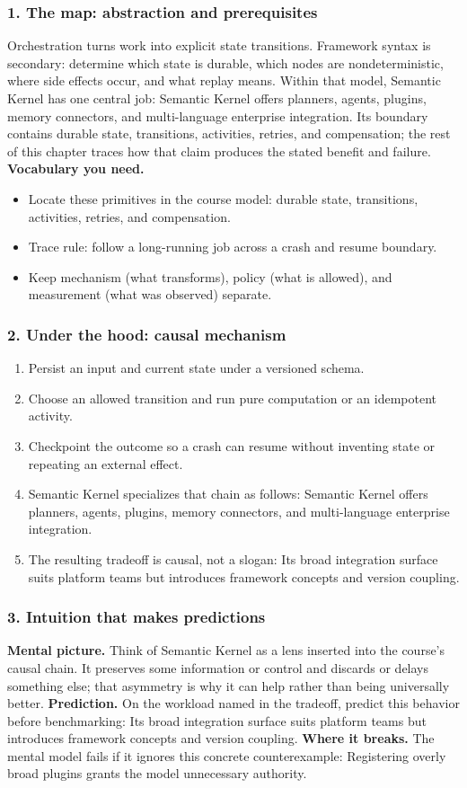 \subsubsection*{1. The map: abstraction and prerequisites}
Orchestration turns work into explicit state transitions. Framework syntax is secondary: determine which state is durable, which nodes are nondeterministic, where side effects occur, and what replay means.
Within that model, Semantic Kernel has one central job: Semantic Kernel offers planners, agents, plugins, memory connectors, and multi-language enterprise integration. Its boundary contains durable state, transitions, activities, retries, and compensation; the rest of this chapter traces how that claim produces the stated benefit and failure.
\textbf{Vocabulary you need.}\begin{itemize}
\item Locate these primitives in the course model: durable state, transitions, activities, retries, and compensation.
\item Trace rule: follow a long-running job across a crash and resume boundary.
\item Keep mechanism (what transforms), policy (what is allowed), and measurement (what was observed) separate.
\end{itemize}
\subsubsection*{2. Under the hood: causal mechanism}\begin{enumerate}
\item Persist an input and current state under a versioned schema.
\item Choose an allowed transition and run pure computation or an idempotent activity.
\item Checkpoint the outcome so a crash can resume without inventing state or repeating an external effect.
\item Semantic Kernel specializes that chain as follows: Semantic Kernel offers planners, agents, plugins, memory connectors, and multi-language enterprise integration.
\item The resulting tradeoff is causal, not a slogan: Its broad integration surface suits platform teams but introduces framework concepts and version coupling.
\end{enumerate}
\subsubsection*{3. Intuition that makes predictions}
\textbf{Mental picture.} Think of Semantic Kernel as a lens inserted into the course's causal chain. It preserves some information or control and discards or delays something else; that asymmetry is why it can help rather than being universally better.
\textbf{Prediction.} On the workload named in the tradeoff, predict this behavior before benchmarking: Its broad integration surface suits platform teams but introduces framework concepts and version coupling.
\textbf{Where it breaks.} The mental model fails if it ignores this concrete counterexample: Registering overly broad plugins grants the model unnecessary authority.
